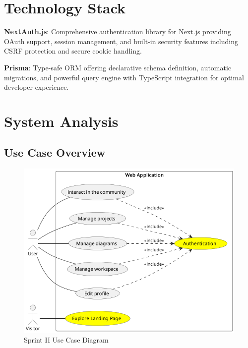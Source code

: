 \section{Technology Stack}

\textbf{NextAuth.js}: Comprehensive authentication library for Next.js providing OAuth support, session management, and built-in security features including CSRF protection and secure cookie handling.

\textbf{Prisma}: Type-safe ORM offering declarative schema definition, automatic migrations, and powerful query engine with TypeScript integration for optimal developer experience.

\section{System Analysis}

\subsection{Use Case Overview}
\begin{figure}[H]
    \centering
    \includegraphics[width=1.0\textwidth]{conception/SprintII/use_case_diagrams/use_case_diagram_of_SprintII.png}
    \caption{Sprint II Use Case Diagram}
    \label{fig:usecase_sprint2}
\end{figure}
\newpage
